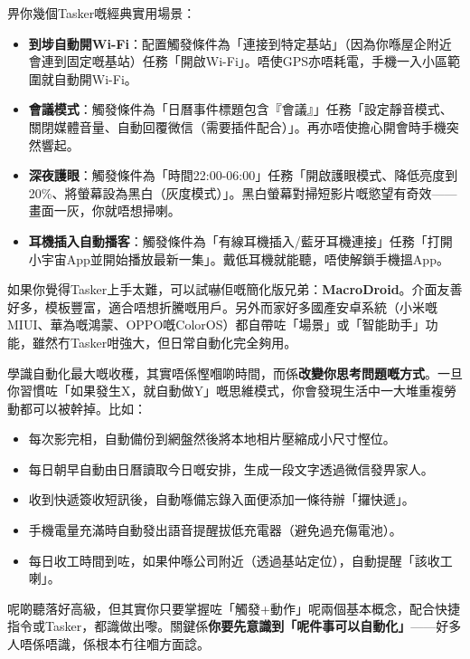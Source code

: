 畀你幾個Tasker嘅經典實用場景：

\begin{itemize}
  \item \textbf{到埗自動開Wi-Fi}：配置觸發條件為「連接到特定基站」（因為你喺屋企附近會連到固定嘅基站）任務「開啟Wi-Fi」。唔使GPS亦唔耗電，手機一入小區範圍就自動開Wi-Fi。
  \item \textbf{會議模式}：觸發條件為「日曆事件標題包含『會議』」任務「設定靜音模式、關閉媒體音量、自動回覆微信（需要插件配合）」。再亦唔使擔心開會時手機突然響起。
  \item \textbf{深夜護眼}：觸發條件為「時間22:00-06:00」任務「開啟護眼模式、降低亮度到20\%、將螢幕設為黑白（灰度模式）」。黑白螢幕對掃短影片嘅慾望有奇效——畫面一灰，你就唔想掃喇。
  \item \textbf{耳機插入自動播客}：觸發條件為「有線耳機插入/藍牙耳機連接」任務「打開小宇宙App並開始播放最新一集」。戴低耳機就能聽，唔使解鎖手機搵App。
\end{itemize}

如果你覺得Tasker上手太難，可以試嚇佢嘅簡化版兄弟：\textbf{MacroDroid}。介面友善好多，模板豐富，適合唔想折騰嘅用戶。另外而家好多國產安卓系統（小米嘅MIUI、華為嘅鴻蒙、OPPO嘅ColorOS）都自帶咗「場景」或「智能助手」功能，雖然冇Tasker咁強大，但日常自動化完全夠用。


學識自動化最大嘅收穫，其實唔係慳嗰啲時間，而係\textbf{改變你思考問題嘅方式}。一旦你習慣咗「如果發生X，就自動做Y」嘅思維模式，你會發現生活中一大堆重複勞動都可以被幹掉。比如：

\begin{itemize}
  \item 每次影完相，自動備份到網盤然後將本地相片壓縮成小尺寸慳位。
  \item 每日朝早自動由日曆讀取今日嘅安排，生成一段文字透過微信發畀家人。
  \item 收到快遞簽收短訊後，自動喺備忘錄入面便添加一條待辦「攞快遞」。
  \item 手機電量充滿時自動發出語音提醒拔低充電器（避免過充傷電池）。
  \item 每日收工時間到咗，如果仲喺公司附近（透過基站定位），自動提醒「該收工喇」。
\end{itemize}

呢啲聽落好高級，但其實你只要掌握咗「觸發+動作」呢兩個基本概念，配合快捷指令或Tasker，都識做出嚟。關鍵係\textbf{你要先意識到「呢件事可以自動化」}——好多人唔係唔識，係根本冇往嗰方面諗。


